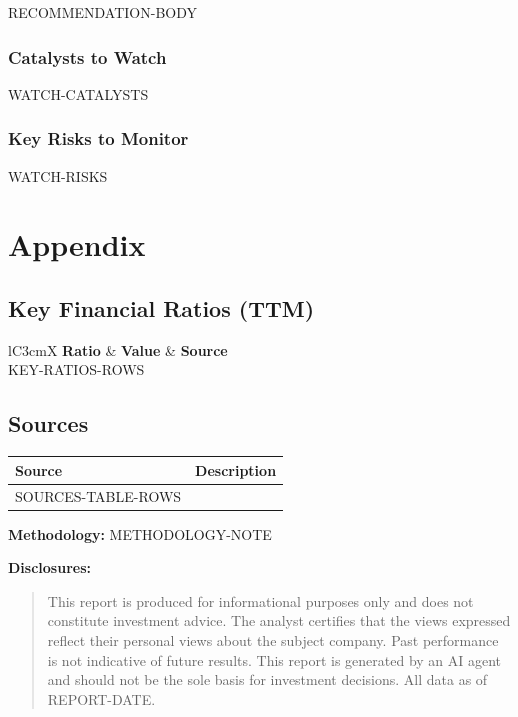\documentclass[11pt,a4paper]{report}
\begin{document}
RECOMMENDATION-BODY

\subsection*{Catalysts to Watch}
\begin{itemize}[nosep]
  WATCH-CATALYSTS
\end{itemize}

\subsection*{Key Risks to Monitor}
\begin{itemize}[nosep]
  WATCH-RISKS
\end{itemize}

\chapter{Appendix}

\section{Key Financial Ratios (TTM)}
\begin{table}[H]
\centering
\caption{Key Financial Ratios}
\begin{tabularx}{\textwidth}{lC{3cm}X}
\toprule
\textbf{Ratio} & \textbf{Value} & \textbf{Source} \\
\midrule
KEY-RATIOS-ROWS
\bottomrule
\end{tabularx}
\end{table}

\section{Sources}
\begin{tabularx}{\textwidth}{lX}
\toprule
\textbf{Source} & \textbf{Description} \\
\midrule
SOURCES-TABLE-ROWS
\bottomrule
\end{tabularx}

\vspace{10pt}
\noindent\textbf{Methodology:} METHODOLOGY-NOTE

\vspace{10pt}
\noindent\textbf{Disclosures:}
\begin{quote}\small
This report is produced for informational purposes only and does not constitute investment advice. The analyst certifies that the views expressed reflect their personal views about the subject company. Past performance is not indicative of future results. This report is generated by an AI agent and should not be the sole basis for investment decisions. All data as of REPORT-DATE.
\end{quote}
\end{document}
